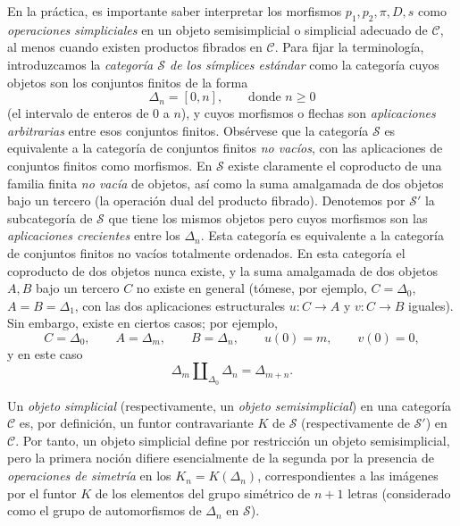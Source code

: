 En la práctica, es importante saber interpretar los morfismos
$p_1,p_2,\pi,D,s$ como \emph{operaciones simpliciales} en un objeto
semisimplicial o simplicial adecuado de $\mathcal C$, al menos cuando existen
productos fibrados en $\mathcal C$. Para fijar la terminología, introduzcamos
la \emph{categoría $\mathcal S$ de los símplices estándar} como la categoría
cuyos objetos son los conjuntos finitos de la forma
\[
  \Delta_n=[0,n],\qquad\text{donde }n\geq 0
\]
(el intervalo de enteros de $0$ a $n$), y cuyos morfismos o flechas son
\emph{aplicaciones arbitrarias} entre esos conjuntos finitos. Obsérvese que la
categoría $\mathcal S$ es equivalente a la categoría de conjuntos finitos
\emph{no vacíos}, con las aplicaciones de conjuntos finitos como morfismos.
En $\mathcal S$ existe claramente el coproducto de una familia finita
\emph{no vacía} de objetos, así como la suma amalgamada de dos objetos bajo un tercero
(la operación dual del producto fibrado). Denotemos por $\mathcal S'$ la
subcategoría de $\mathcal S$ que tiene los mismos objetos pero cuyos morfismos
son las \emph{aplicaciones crecientes} entre los $\Delta_n$. Esta categoría es
equivalente a la categoría de conjuntos finitos no vacíos totalmente
ordenados. En esta categoría el
coproducto de dos objetos nunca existe, y la suma amalgamada de dos objetos $A,B$ bajo
un tercero $C$ no existe en general (tómese, por ejemplo, $C=\Delta_0$,
$A=B=\Delta_1$, con las dos aplicaciones estructurales $u:C\to A$ y
$v:C\to B$ iguales). Sin embargo, existe en ciertos casos; por ejemplo,
\[
  C=\Delta_0,\qquad A=\Delta_m,\qquad B=\Delta_n,\qquad
  u(0)=m,\qquad v(0)=0,
\]
y en este caso
\[
  \Delta_m\amalg_{\Delta_0}\Delta_n=\Delta_{m+n}.
\]

Un \emph{objeto simplicial} (respectivamente, un \emph{objeto
semisimplicial}) en una categoría $\mathcal C$ es, por definición, un funtor
contravariante $K$ de $\mathcal S$ (respectivamente de $\mathcal S'$) en
$\mathcal C$. Por tanto, un objeto simplicial define por restricción un objeto
semisimplicial, pero la primera noción difiere esencialmente de la segunda por
la presencia de \emph{operaciones de simetría} en los $K_n=K(\Delta_n)$,
correspondientes a las imágenes por el funtor $K$ de los elementos del grupo
simétrico de $n+1$ letras (considerado como el grupo de automorfismos de
$\Delta_n$ en $\mathcal S$).

